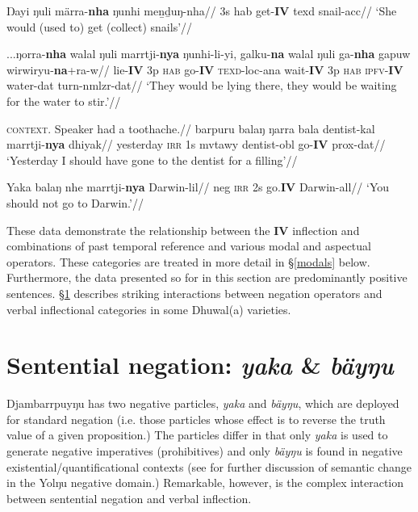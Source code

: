 \pex\a{}\begingl\gla Ŋayi ŋuli märra-\textbf{nha} ŋunhi meṉḏuŋ-nha//
\glb 3s \gls{hab} get-\textbf{IV} \gls{texd} snail-\gls{acc}//
\glft`She would (used to) get (collect) snails'//\endgl

\a\begingl\gla ...ŋorra-\textbf{nha} walal ŋuli marrtji-\textbf{nya} ŋunhi-li-yi, galku-\textbf{na} walal ŋuli ga-\textbf{nha} gapuw wirwiryu-\textbf{na}+ra-w//
\glb lie-\textbf{IV} 3p \textsc{hab} go-\textbf{IV} \textsc{texd}-\gls{loc}-\gls{ana} wait-\textbf{IV} 3p \textsc{hab} \textsc{ipfv}-\textbf{IV} water-\gls{dat} turn-\gls{nmlzr}-\gls{dat}//
\glft`They would be lying there, they would be waiting for the water to stir.'//\endgl

\xe


\pex\a\begingl\glpreamble{}\textsc{context.} Speaker had a toothache.//
\gla barpuru balaŋ ŋarra bala dentist-kal marrtji-\textbf{nya} dhiyak//
\glb yesterday \textsc{irr} 1s \gls{mvtawy} dentist-\gls{obl} go-\textbf{IV} \gls{prox}-\gls{dat}//
\glft`Yesterday I should have gone to the dentist for a filling'//\endgl

\a\begingl\gla Yaka balaŋ nhe marrtji-\textbf{nya} Darwin-lil//
\glb \gls{neg} \textsc{irr} 2s go.\textbf{IV} Darwin-\gls{all}//
\glft`You should not go to Darwin.'//\endgl\xe


These data demonstrate the relationship between the \textbf{IV} inflection and combinations of past temporal reference and various modal and aspectual operators. These categories are treated in more detail in §\ref{modals} below. Furthermore, the data presented so for in this section are predominantly positive sentences. §\ref{negs} describes striking interactions between negation operators and verbal inflectional categories in some Dhuwal(a) varieties.

\section{Sentential negation: \textit{yaka} \& \textit{bäyŋu}}\label{negs}

Djambarrpuyŋu has two negative particles, \textit{yaka} and \textit{bäyŋu}, which are deployed for standard negation (i.e. those particles whose effect is to reverse the truth value of a given proposition.) The particles differ in that only \textit{yaka} is used to generate negative imperatives (prohibitives) and only \textit{bäyŋu} is found in negative existential/quantificational contexts (see \citet{Phillips2019b} for further discussion of semantic change in the Yolŋu negative domain.) Remarkable, however, is the complex interaction between sentential negation and verbal inflection.

